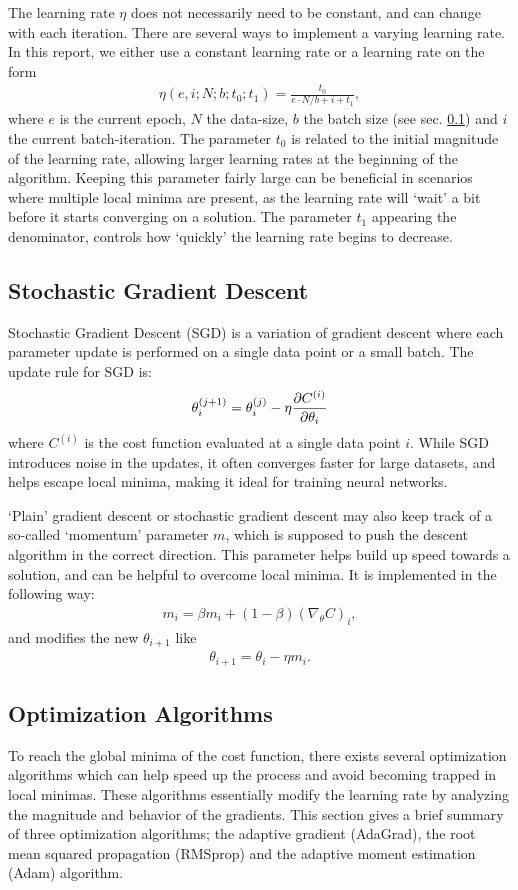 \documentclass[%
reprint,s
amsmath,amssymb,
aps,
]{revtex4-2}
\begin{document}
The learning rate \(\eta\) does not necessarily need to be constant, and can change with each iteration. There are several ways to implement a varying learning rate. In this report, we either use a constant learning rate or a learning rate on the form 
\begin{align} \label{eq:varyin_learning_rate}
	\eta(e,i;N;b;t_0;t_1) = \frac{t_0}{e\cdot N/b + i + t_1},
\end{align}
where \(e\) is the current epoch, \(N\) the data-size, \(b\) the batch size (see sec. \ref{sec:stochastic_gradient_descent}) and \(i\) the current batch-iteration. The parameter \(t_0\) is related to the initial magnitude of the learning rate, allowing larger learning rates at the beginning of the algorithm. Keeping this parameter fairly large can be beneficial in scenarios where multiple local minima are present, as the learning rate will `wait' a bit before it starts converging on a solution. The parameter \(t_1\) appearing the denominator, controls how  `quickly' the learning rate begins to decrease. 

\subsection{Stochastic Gradient Descent} \label{sec:stochastic_gradient_descent}
Stochastic Gradient Descent (SGD) is a variation of gradient descent where each parameter update is performed on a single data point or a small batch. The update rule for SGD is:
\[
\theta_i^{(j+1)} = \theta_i^{(j)} - \eta \pdv{C^{(i)}}{\theta_i}
\]
where $C^{(i)}$ is the cost function evaluated at a single data point $i$. While SGD introduces noise in the updates, it often converges faster for large datasets, and helps escape local minima, making it ideal for training neural networks.

`Plain' gradient descent or stochastic gradient descent may also keep track of a so-called `momentum' parameter \(m\), which is supposed to push the descent algorithm in the correct direction. This parameter helps build up speed towards a solution, and can be helpful to overcome local minima. It is implemented in the following way:
\begin{align}
	m_i = \beta m_i + (1-\beta)(\nabla_{\theta}C)_i,
\end{align}
and modifies the new \(\theta_{i+1}\) like 
\begin{align}
	\theta_{i+1} = \theta_{i} - \eta m_i.
\end{align}


\subsection{Optimization Algorithms} \label{sec:optimization_algorithms}
To reach the global minima of the cost function, there exists several optimization algorithms which can help speed up the process and avoid becoming trapped in local minimas. These algorithms essentially modify the learning rate by analyzing the magnitude and behavior of the gradients. This section gives a brief summary of three optimization algorithms; the adaptive gradient (AdaGrad), the root mean squared propagation (RMSprop) and the adaptive moment estimation (Adam) algorithm. 
\end{document}
